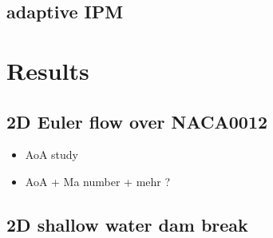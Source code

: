 \documentclass{article}
\begin{document}
\subsection{adaptive IPM}
\section{Results}
\subsection{2D Euler flow over NACA0012}
\begin{itemize}
	\item AoA study
	\item AoA + Ma number + mehr ?
\end{itemize}
\subsection{2D shallow water dam break}

  

\end{document}
